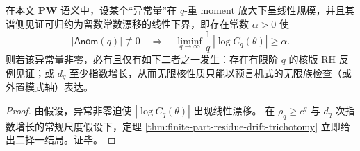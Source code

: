 \begin{corollary}\label{cor:finite-part-oracle-anomaly-equivalence}
在本文 \(\mathbf{PW}\) 语义中，设某个“异常量”在 \(q\)-重 moment 放大下呈线性规模，并且其谱侧见证可归约为留数常数漂移的线性下界，即存在常数 \(\alpha>0\) 使
\[
|\mathsf{Anom}(q)|\not\equiv 0
\quad\Longrightarrow\quad
\liminf_{q\to\infty}\frac{1}{q}\,|\log C_q(\theta)|\ge \alpha.
\]
则若该异常量非零，必有且仅有如下二者之一发生：存在有限阶 \(q\) 的核版 RH 反例见证；或 \(d_q\) 至少指数增长，从而无限核性质只能以预言机式的无限族检查（或外置模式轴）表达。
\end{corollary}

\begin{proof}
由假设，异常非零迫使 \(|\log C_q(\theta)|\) 出现线性漂移。
在 \(\rho_q\ge c^q\) 与 \(d_q\) 次指数增长的常规尺度假设下，定理 \ref{thm:finite-part-residue-drift-trichotomy} 立即给出二择一结局。证毕。
\end{proof}

